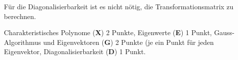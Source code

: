 \begin{diskussion}
Für die Diagonalisierbarkeit ist es nicht nötig, die Transformationsmatrix
zu berechnen.
\end{diskussion}

\begin{bewertung}
Charakteristisches Polynome ({\bf X}) 2 Punkte,
Eigenwerte ({\bf E}) 1 Punkt,
Gauss-Algorithmus und Eigenvektoren ({\bf G}) 2 Punkte (je ein Punkt
für jeden Eigenvektor,
Diagonalisierbarkeit ({\bf D}) 1 Punkt.
\end{bewertung}

